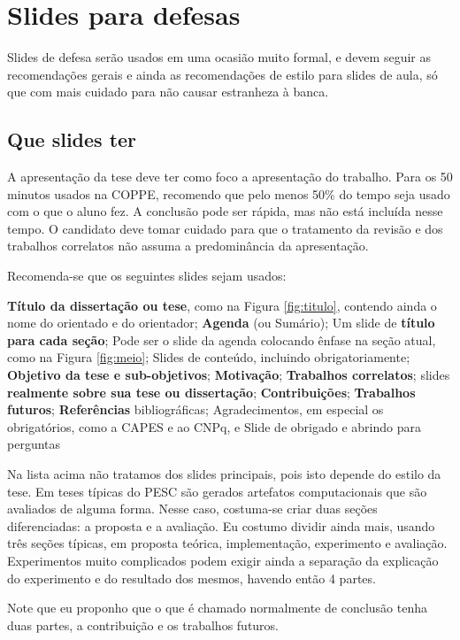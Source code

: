 \section{Slides para defesas}

Slides de defesa serão usados em uma ocasião muito formal, e devem seguir as recomendações gerais e ainda as recomendações de estilo para slides de aula, só que com mais cuidado para não causar estranheza à banca.

\subsection{Que slides ter}

A apresentação da tese deve ter como foco a apresentação do trabalho. Para os 50 minutos usados na COPPE, recomendo que pelo menos 50\% do tempo seja usado com o que o aluno fez. A conclusão pode ser rápida, mas não está incluída nesse tempo. O candidato deve tomar cuidado para que o tratamento da revisão e dos trabalhos correlatos não assuma a predominância da apresentação.

Recomenda-se que os seguintes slides sejam usados:
\begin{outline}
    \1 \textbf{Título da dissertação ou tese}, como na Figura \ref{fig:titulo}, contendo ainda o nome do orientado e do orientador;
    \1 \textbf{Agenda} (ou Sumário);
    \1 Um slide de \textbf{título para cada seção};
    \2 Pode ser o slide da agenda colocando ênfase na seção atual, como na Figura \ref{fig:meio};
    \2 Slides de conteúdo, incluindo obrigatoriamente;
        \3 \textbf{Objetivo da tese e sub-objetivos};
        \3 \textbf{Motivação};
        \3 \textbf{Trabalhos correlatos};
        \3 slides \textbf{realmente sobre sua tese ou dissertação};
        \3 \textbf{Contribuições};
        \3 \textbf{Trabalhos futuros};
    \1 \textbf{Referências} bibliográficas;
    \1 Agradecimentos, em especial os obrigatórios, como a CAPES e ao CNPq, e
    \1 Slide de obrigado e abrindo para perguntas
\end{outline}

Na lista acima não tratamos dos slides principais, pois isto depende do estilo da tese. Em teses típicas do PESC são gerados artefatos computacionais que são avaliados de alguma forma. Nesse caso, costuma-se criar duas seções diferenciadas: a proposta e a avaliação. Eu costumo dividir ainda mais, usando três seções típicas, em proposta teórica, implementação, experimento e avaliação. Experimentos muito complicados podem exigir ainda a separação da explicação do experimento e do resultado dos mesmos, havendo então 4 partes.

Note que  eu proponho que o que é chamado normalmente de conclusão tenha duas partes, a contribuição e os trabalhos futuros.
